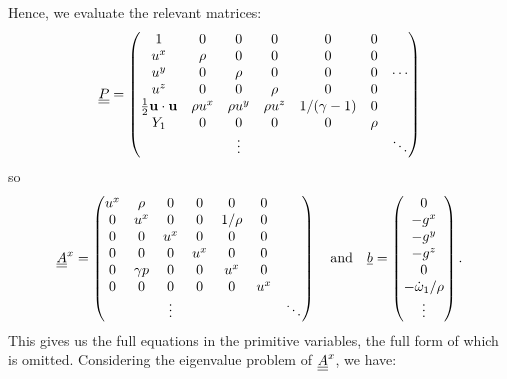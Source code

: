 Hence, we evaluate the relevant matrices:
\begin{equation}
\underline{\underline{P}} = \begin{pmatrix}
1   & 0  & 0 & 0 & 0 & 0 &  \\
u^x & \rho & 0 & 0 & 0 & 0 &  \\
u^y & 0 & \rho & 0 & 0 & 0 & \cdots \\
u^z & 0 & 0 & \rho & 0 & 0 &  \\
\frac{1}{2} \mathbf{u} \cdot \mathbf{u} & \rho u^x & \rho u^y & \rho u^z & 1/(\gamma - 1) & 0 & \\
Y_1 & 0 & 0 & 0 & 0 & \rho & \\
 &  & \vdots &  &  &  & \ddots
\end{pmatrix}
\end{equation}
so
\begin{equation}
\underline{\underline{A}}^x = \begin{pmatrix}
u^x & \rho & 0 & 0 & 0 & 0 & \\
0 & u^x & 0 & 0 & 1 / \rho & 0 & \\
0 & 0 & u^x & 0 & 0 & 0 & \\
0 & 0 & 0 & u^x & 0 & 0 & \\
0 & \gamma p & 0 & 0 & u^x & 0 &  \\
0 & 0 & 0 & 0 & 0 & u^x & \\
 &  & \vdots &  &  &  & \ddots
\end{pmatrix}
\quad \text{and} \quad
\underline{b} = \begin{pmatrix} 0 \\ -g^x \\ -g^y \\ -g^z \\ 0 \\ -\dot{\omega}_1 / \rho \\ \vdots\end{pmatrix}.
\end{equation}
This gives us the full equations in the primitive variables, the full form of which is omitted. Considering the eigenvalue problem of $\underline{\underline{A}}^x$, we have:
